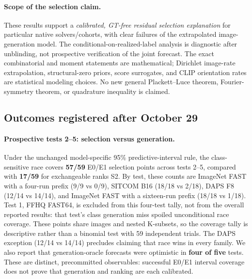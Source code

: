 \paragraph{Scope of the selection claim.}
These results support a \emph{calibrated, GT-free residual
selection explanation} for particular native solvers/cohorts,
with clear failures of the extrapolated image-generation model.
The conditional-on-realized-label analysis is diagnostic after
unblinding, not prospective verification of the joint forecast.
The exact combinatorial and moment statements are mathematical;
Dirichlet image-rate extrapolation, structural-zero priors,
score surrogates, and CLIP orientation rates are statistical
modeling choices. No new general Plackett--Luce theorem,
Fourier-symmetry theorem, or quadrature inequality is claimed.

\subsection{Outcomes registered after October 29}
\label{app:s3-post-registration-20261031}

\paragraph{Prospective tests 2--5: selection versus generation.}
Under the unchanged model-specific 95\% predictive-interval rule,
the class-sensitive race covers \textbf{57/59} E0/E1 selection
points across tests 2--5, compared with \textbf{17/59}
for exchangeable ranks S2. By test, these counts are ImageNet
FAST with a four-run prefix (9/9 vs 0/9), SITCOM B16
(18/18 vs 2/18), DAPS F8 (12/14 vs 14/14), and
ImageNet FAST with a sixteen-run prefix (18/18 vs 1/18).
Test 1, FFHQ FAST64, is excluded from this four-test tally,
not from the overall reported results: that test's class
generation miss spoiled unconditional race coverage.
These points share images and nested K-subsets, so the coverage tally
is descriptive rather than a binomial test with 59 independent trials.
The DAPS exception (12/14 vs 14/14) precludes claiming
that race wins in every family. We also report
that generation-oracle forecasts were optimistic in
\textbf{four of five} tests. These are distinct,
precommitted observables: successful E0/E1 interval coverage
does not prove that generation and ranking are each calibrated.

